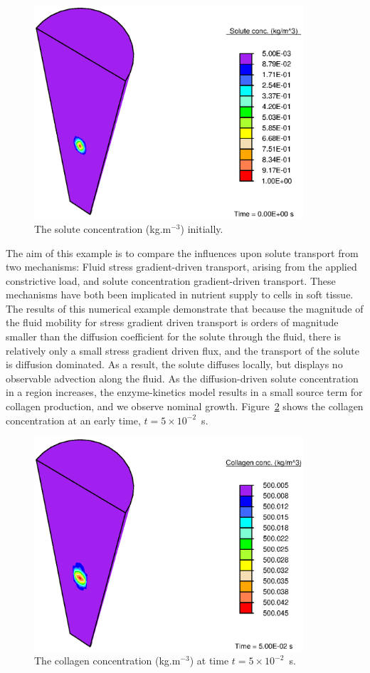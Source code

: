 \begin{figure}
\centering
\includegraphics[width=10.00cm]{images/initial-solute-concentration.eps}
\caption{The solute concentration (kg.m$^{-3}$) initially.}
\label{eg3ini}
\end{figure}

The aim of this example is to compare the influences upon solute
transport from two mechanisms: Fluid stress gradient-driven transport,
arising from the applied constrictive load, and solute concentration
gradient-driven transport. These mechanisms have both been implicated
in nutrient supply to cells in soft tissue. The results of this
numerical example demonstrate that because the magnitude of the fluid mobility
for stress gradient driven transport is orders of magnitude
smaller than the diffusion coefficient for the solute through the
fluid, there is relatively only a small stress gradient driven flux,
and the transport of the solute is diffusion dominated. As a result,
the solute diffuses locally, but displays no
observable advection along the fluid. As the diffusion-driven solute
concentration in a region increases, the enzyme-kinetics model
results in a small source term for collagen production, and we observe nominal
growth. Figure~\ref{eg3conc} shows the collagen concentration at an
early time, $t=5\times10^{-2}$~s.

\begin{figure}
\centering
\includegraphics[width=10.00cm]{images/final-collagen-concentration.eps}
\caption{The collagen concentration (kg.m$^{-3}$) at time
  $t=5\times10^{-2}$~s.}
\label{eg3conc}
\end{figure}

